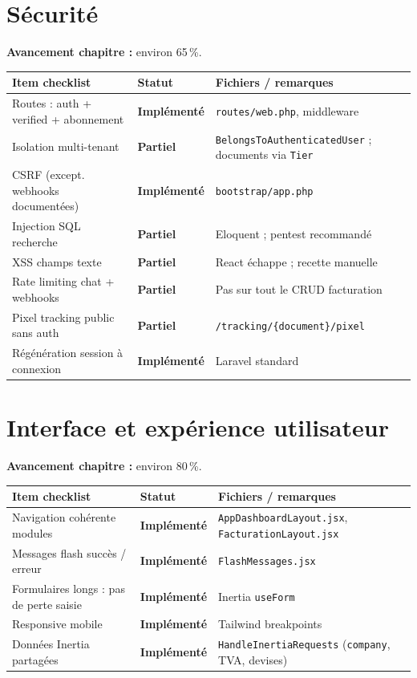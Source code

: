 \documentclass[11pt,a4paper]{report}
\newcommand{\route}[1]{\texttt{\small #1}}
\newcommand{\ctrl}[1]{\texttt{\small #1}}
\newcommand{\model}[1]{\texttt{\small #1}}
\newcommand{\statimpl}{\textcolor{statok}{\textbf{Implémenté}}}
\newcommand{\statpart}{\textcolor{statpartial}{\textbf{Partiel}}}
\begin{document}
\chapter{Sécurité}

\textbf{Avancement chapitre :} environ 65\,\%.

\begin{longtable}{@{}L{7.8cm}C{2.4cm}L{4.4cm}@{}}
    \toprule
    \textbf{Item checklist} & \textbf{Statut} & \textbf{Fichiers / remarques} \\
    \midrule
    \endhead
    Routes : auth + verified + abonnement & \statimpl & \route{routes/web.php}, middleware \\
    Isolation multi-tenant & \statpart & \model{BelongsToAuthenticatedUser} ; documents via \model{Tier} \\
    CSRF (except. webhooks documentées) & \statimpl & \route{bootstrap/app.php} \\
    Injection SQL recherche & \statpart & Eloquent ; pentest recommandé \\
    XSS champs texte & \statpart & React échappe ; recette manuelle \\
    Rate limiting chat + webhooks & \statpart & Pas sur tout le CRUD facturation \\
    Pixel tracking public sans auth & \statpart & \route{/tracking/\{document\}/pixel} \\
    Régénération session à connexion & \statimpl & Laravel standard \\
    \bottomrule
\end{longtable}

\chapter{Interface et expérience utilisateur}

\textbf{Avancement chapitre :} environ 80\,\%.

\begin{longtable}{@{}L{7.8cm}C{2.4cm}L{4.4cm}@{}}
    \toprule
    \textbf{Item checklist} & \textbf{Statut} & \textbf{Fichiers / remarques} \\
    \midrule
    \endhead
    Navigation cohérente modules & \statimpl & \route{AppDashboardLayout.jsx}, \route{FacturationLayout.jsx} \\
    Messages flash succès / erreur & \statimpl & \route{FlashMessages.jsx} \\
    Formulaires longs : pas de perte saisie & \statimpl & Inertia \texttt{useForm} \\
    Responsive mobile & \statimpl & Tailwind breakpoints \\
    Données Inertia partagées & \statimpl & \ctrl{HandleInertiaRequests} (\texttt{company}, TVA, devises) \\
    \bottomrule
\end{longtable}
\end{document}
